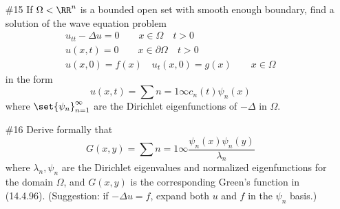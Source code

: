 \documentclass[11pt, oneside]{article}
\begin{document}
\begin{enumerate}
\begin{enumerate}
\begin{proof}
          Now if $f \in H_0^1(\Omega)$ then 
          \[
            \sum{n = 1}{\infty}{\abs{\abr[H^1_0(\Omega)]{f, \zeta_n}}^2} < \infty
          \]
          and equivalently
          \[
            \sum{n = 1}{\infty}{\lambda_n \abs{\abr{f, \psi_n}}^2} < \infty.
          \]
          If on the other hand
          \[
            \sum{n = 1}{\infty}{\lambda_n \abs{\abr{f, \psi_n}}^2} < \infty.
          \]
          then
          \[
            \sum{n = 1}{\infty}{\abs{\abr[H^1_0(\Omega)]{f, \zeta_n}}^2} < \infty
          \]
          which implies that $f \in H^1_0(\Omega)$.
        \end{proof}
    \end{enumerate}

  \pagebreak
  \item[\#15]
    If $\Omega < \RR^n$ is a bounded open set with smooth enough boundary, find
    a solution of the wave equation problem
    \begin{align*}
      u_{tt} - \Delta u = 0 \qquad x \in \Omega \quad t > 0 \\
      u(x, t) = 0 \qquad x \in \partial\Omega \quad t > 0 \\
      u(x, 0) = f(x) \quad u_t(x, 0) = g(x) \qquad x \in \Omega
    \end{align*}
    in the form
    \[
      u(x, t) = \sum{n = 1}{\infty}{c_n(t) \psi_n(x)}
    \]
    where $\set{\psi_n}_{n = 1}^{\infty}$ are the Dirichlet eigenfunctions of
    $-\Delta$ in $\Omega$.

  \pagebreak
  \item[\#16]
    Derive formally that
    \[
      G(x, y) = \sum{n=1}{\infty}{\frac{\psi_n(x) \psi_n(y)}{\lambda_n}}
    \]
    where $\lambda_n, \psi_n$ are the Dirichlet eigenvalues and normalized
    eigenfunctions for the domain $\Omega$, and $G(x, y)$ is the corresponding
    Green's function in (14.4.96).
    (Suggestion: if $-\Delta u = f$, expand both $u$ and $f$ in the $\psi_n$
    basis.)


\end{enumerate}
\end{document}
